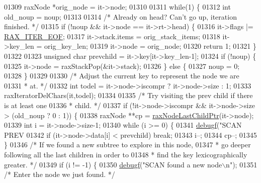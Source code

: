 \begin{DoxyCode}
{{{{{{{{{{{{{{{{{{{01309     raxNode *orig\_node = it->node;
01310 
01311     \textcolor{keywordflow}{while}(1) \{
01312         \textcolor{keywordtype}{int} old\_noup = noup;
01313 
01314         \textcolor{comment}{/* Already on head? Can't go up, iteration finished. */}
01315         \textcolor{keywordflow}{if} (!noup && it->node == it->rt->head) \{
01316             it->flags |= \hyperlink{rax_8h_a4fb08a914b84ba0a39daa86297176e1c}{RAX\_ITER\_EOF};
01317             it->stack.items = orig\_stack\_items;
01318             it->key\_len = orig\_key\_len;
01319             it->node = orig\_node;
01320             \textcolor{keywordflow}{return} 1;
01321         \}
01322 
01323         \textcolor{keywordtype}{unsigned} \textcolor{keywordtype}{char} prevchild = it->key[it->key\_len-1];
01324         \textcolor{keywordflow}{if} (!noup) \{
01325             it->node = raxStackPop(&it->stack);
01326         \} \textcolor{keywordflow}{else} \{
01327             noup = 0;
01328         \}
01329 
01330         \textcolor{comment}{/* Adjust the current key to represent the node we are}
01331 \textcolor{comment}{         * at. */}
01332         \textcolor{keywordtype}{int} todel = it->node->iscompr ? it->node->size : 1;
01333         raxIteratorDelChars(it,todel);
01334 
01335         \textcolor{comment}{/* Try visiting the prev child if there is at least one}
01336 \textcolor{comment}{         * child. */}
01337         \textcolor{keywordflow}{if} (!it->node->iscompr && it->node->size > (old\_noup ? 0 : 1)) \{
01338             raxNode **cp = \hyperlink{rax_8c_a2c5310b0d00672508a8f935a7109f4ce}{raxNodeLastChildPtr}(it->node);
01339             \textcolor{keywordtype}{int} i = it->node->size-1;
01340             \textcolor{keywordflow}{while} (i >= 0) \{
01341                 \hyperlink{rax_8c_a10b215c81aa397dbc44adfb3e436befb}{debugf}(\textcolor{stringliteral}{"SCAN PREV %
01342                 \textcolor{keywordflow}{if} (it->node->data[i] < prevchild) \textcolor{keywordflow}{break};
01343                 i--;
01344                 cp--;
01345             \}
01346             \textcolor{comment}{/* If we found a new subtree to explore in this node,}
01347 \textcolor{comment}{             * go deeper following all the last children in order to}
01348 \textcolor{comment}{             * find the key lexicographically greater. */}
01349             \textcolor{keywordflow}{if} (i != -1) \{
01350                 \hyperlink{rax_8c_a10b215c81aa397dbc44adfb3e436befb}{debugf}(\textcolor{stringliteral}{"SCAN found a new node\(\backslash\)n"});
01351                 \textcolor{comment}{/* Enter the node we just found. */}
}}}}}}}}}}}}}}}}}}}}
\end{DoxyCode}

